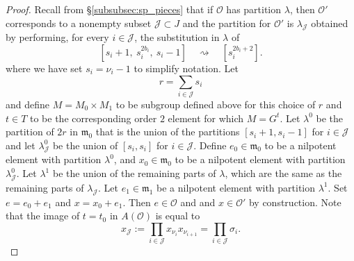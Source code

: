 \documentclass{amsart}
\theoremstyle{definition}
\newcommand{\frakm}{\mathfrak{m}}
\newcommand{\g}{\mathfrak{g}}
\newcommand{\0}{\mathcal{O}}
\begin{document}
\begin{proof}
Recall from \S\ref{subsubsec:sp_pieces} that if $\0$ has partition $\lambda$, then 
$\0'$ corresponds to a nonempty subset ${\mathcal J} \subset J$ and the partition for $\0'$
is $\lambda_{\mathcal J}$ obtained by performing, for every $i\in {\mathcal J}$, the substitution in $\lambda$ of
\[
	[s_i\!+\!1,\ s_i^{2b_i},\ s_i\!-\!1] \quad\rightsquigarrow\quad [s_i^{2b_i+2}].
\]
where we have set $s_i = \nu_i\!-\!1$ to simplify notation.
Let $$r = \sum_{i \in {\mathcal J}} s_i$$
and define $M = M_0 \times M_1$ to be subgroup defined above for this choice of $r$ and 
$t \in T$ to be the corresponding
order $2$ element for which $M = G^t$.
Let $\lambda^{0}$ be the partition of $2r$ in $\frakm_0$ that is the union of 
the partitions $[s_i+1,s_i-1]$ for $i \in {\mathcal J}$ and 
let $\lambda_{\mathcal J}^{0}$ be the union of $[s_i, s_i]$ for $i \in {\mathcal J}$.
Define $e_0 \in \frakm_0$ to be a nilpotent element with partition $\lambda^0$, 
and $x_0\in\frakm_0$ to be a nilpotent element with partition $\lambda_{\mathcal J}^0$.  
Let $\lambda^1$ be the union of the remaining parts of 
$\lambda$, which are the same
as the remaining parts of $\lambda_{\mathcal J}$. 
Let $e_1 \in \frakm_1$ be a nilpotent element with partition $\lambda^1$.
Set $e = e_0+e_1$ and $x =x_0+e_1$.  Then $e \in\0$ and and $x \in \0'$ by construction.
Note that the image of $t = t_0$ in $A(\0)$ is equal to
$$x_{\mathcal J} :=\prod_{i\in \mathcal J} x_{\nu_i}x_{\nu_{i+1}} = 
\prod_{i\in \mathcal J} \sigma_i.$$





\end{proof}
\end{document}
